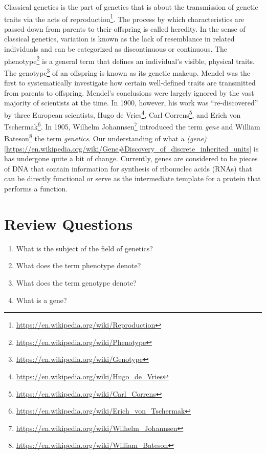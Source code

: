 \documentclass[]{book}
\providecommand{\tightlist}{%
  \setlength{\itemsep}{0pt}\setlength{\parskip}{0pt}}
\let\rmarkdownfootnote\footnote%
\def\footnote{\protect\rmarkdownfootnote}
\renewcommand{\href}[2]{#2\footnote{\url{#1}}}
\theoremstyle{definition}
\theoremstyle{definition}
\theoremstyle{definition}
\theoremstyle{remark}
\begin{document}
Classical genetics is the part of genetics that is about the
transmission of genetic traits via the acts of
\href{https://en.wikipedia.org/wiki/Reproduction}{reproduction}. The
process by which characteristics are passed down from parents to their
offspring is called heredity. In the sense of classical genetics,
variation is known as the lack of resemblance in related individuals and
can be categorized as discontinuous or continuous. The
\href{https://en.wikipedia.org/wiki/Phenotype}{phenotype} is a general
term that defines an individual's visible, physical traits. The
\href{https://en.wikipedia.org/wiki/Genotype}{genotype} of an offspring
is known as its genetic makeup. Mendel was the first to systematically
investigate how certain well-defined traits are transmitted from parents
to offspring. Mendel's conclusions were largely ignored by the vast
majority of scientists at the time. In 1900, however, his work was
``re-discovered'' by three European scientists,
\href{https://en.wikipedia.org/wiki/Hugo_de_Vries}{Hugo de Vries},
\href{https://en.wikipedia.org/wiki/Carl_Correns}{Carl Correns}, and
\href{https://en.wikipedia.org/wiki/Erich_von_Tschermak}{Erich von
Tschermak}. In 1905,
\href{https://en.wikipedia.org/wiki/Wilhelm_Johannsen}{Wilhelm
Johannsen} introduced the term \emph{gene} and
\href{https://en.wikipedia.org/wiki/William_Bateson}{William Bateson}
the term \emph{genetics}. Our understanding of what a
\emph{(gene)}{[}\url{https://en.wikipedia.org/wiki/Gene\#Discovery_of_discrete_inherited_units}{]}
is has undergone quite a bit of change. Currently, genes are considered
to be pieces of DNA that contain information for synthesis of ribonuclec
acids (RNAs) that can be directly functional or serve as the
intermediate template for a protein that performs a function.

\section{Review Questions}\label{review-questions}

\begin{enumerate}
\def\labelenumi{\arabic{enumi}.}
\tightlist
\item
  What is the subject of the field of genetics?
\item
  What does the term phenotype denote?
\item
  What does the term genotype denote?
\item
  What is a gene?
\end{enumerate}
\end{document}
